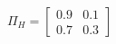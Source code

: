 \documentclass[border=3mm,preview]{standalone}\usepackage{amsmath}
\begin{document}
\[ \Pi_{H} = 
\left[\begin{array}{cc} 
0.9 & 0.1 \\ 
0.7 & 0.3 
\end{array}\right] \] 
\end{document}
